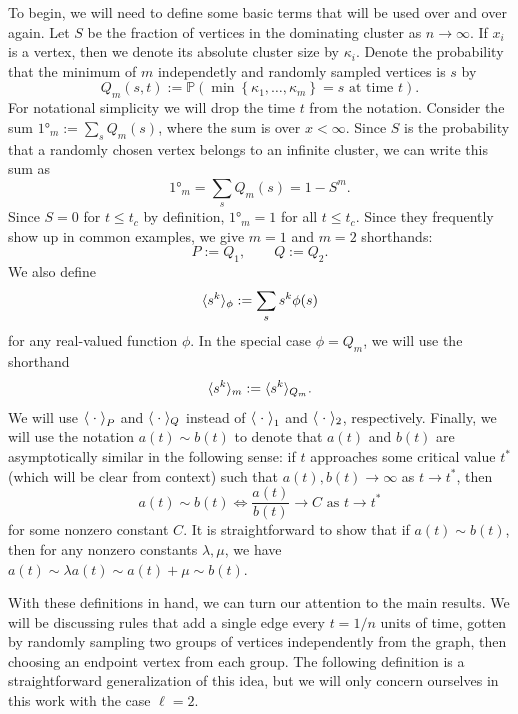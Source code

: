 \documentclass[twoside,10pt]{article}
\begin{document}
To begin, we will need to define some basic terms that will be used over and over again. Let $S$ be the fraction of vertices in the dominating cluster as $n \to \infty$. If $x_i$ is a vertex, then we denote its absolute cluster size by $\kappa_i$. Denote the probability that the minimum of $m$ independetly and randomly sampled vertices is $s$ by
\[
        Q_m(s, t) := \mathbb{P}\left( \min\left\{ \kappa_1, \dots, \kappa_m \right\} = s \text{ at time } t \right) .
\]
For notational simplicity we will drop the time $t$ from the notation. Consider the sum $\ang{1}_{m} := \sum_{s} Q_{m}(s)$, where the sum is over $x < \infty$. Since $S$ is the probability that a randomly chosen vertex belongs to an infinite cluster, we can write this sum as
\begin{equation}
	\ang{1}_{m} = \sum_{s} Q_{m}(s) = 1-S^{m}.
\end{equation}
Since $S=0$ for $t \leq t_{c}$ by definition, $\ang{1}_{m}=1$ for all $t \leq t_c$. Since they frequently show up in common examples, we give $m=1$ and $m=2$ shorthands:
\[
        P := Q_1, \quad\quad Q := Q_2.
\]
We also define
\[
	\langle s^{k} \rangle_{\phi} := \sum_{s} s^{k} \phi(s)
\] 
for any real-valued function $\phi$. In the special case $\phi = Q_{m}$, we will use the shorthand
\[
        \langle s^{k} \rangle_{m} := \langle s^{k} \rangle_{Q_{m}}.
\]
We will use $\left\langle \;\cdot\; \right\rangle_{P}$ and $\langle \;\cdot\; \rangle_{Q}$ instead of $\left\langle \;\cdot\; \right\rangle_{1}$ and $\langle \;\cdot\; \rangle_{2}$, respectively. Finally, we will use the notation $a(t) \sim b(t)$ to denote that $a(t)$ and $b(t)$ are asymptotically similar in the following sense: if $t$ approaches some critical value $t^{*}$ (which will be clear from context) such that $a(t), b(t) \to \infty$ as $t\to t^{*}$, then
\[
a(t) \sim b(t) \iff \frac{a(t)}{b(t)} \to C \text{ as } t\to t^{*}
\] for some nonzero constant $C$. It is straightforward to show that if $a(t) \sim b(t)$, then for any nonzero constants $\lambda, \mu$, we have $a(t) \sim \lambda a(t) \sim a(t) + \mu \sim b(t)$.

With these definitions in hand, we can turn our attention to the main results. We will be discussing rules that add a single edge every $t=1/n$ units of time, gotten by randomly sampling two groups of vertices independently from the graph, then choosing an endpoint vertex from each group. The following definition is a straightforward generalization of this idea, but we will only concern ourselves in this work with the case $\ell=2$.
\end{document}
